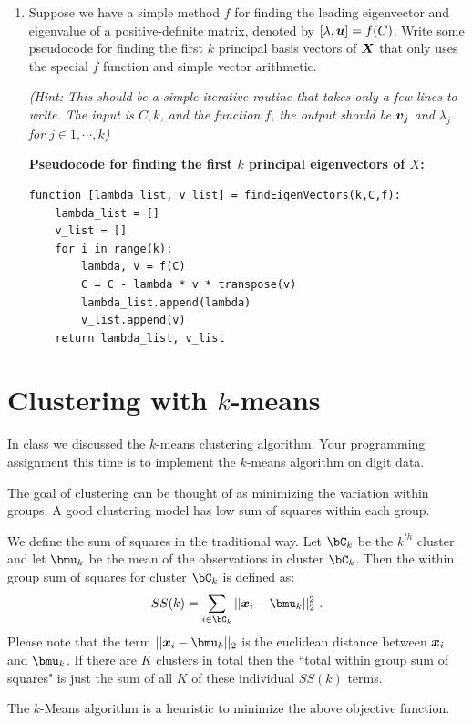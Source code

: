 \documentclass{article}
\begin{document}
\begin{enumerate}[label=(\alph*)]
\item Suppose we have a simple method $f$ for finding the leading eigenvector and eigenvalue of a positive-definite matrix, denoted by
$[\lambda, \boldsymbol{u}] = f(C)$. Write some pseudocode for finding the first $k$ principal basis vectors of $\boldsymbol{X}$ that only uses the special $f$ function
and simple vector arithmetic.

\emph{(Hint: This should be a simple iterative routine that takes only a few lines to write. The input is $C, k$, and the function $f$, the output
should be $\boldsymbol{v}_j$ and $\lambda_j$ for $j \in 1,\cdots, k$)}

\begin{mdframed}[backgroundcolor=lightgray]
\textbf{Pseudocode for finding the first $k$ principal eigenvectors of $X$:}\\
\begin{lstlisting}
function [lambda_list, v_list] = findEigenVectors(k,C,f):
	lambda_list = []
	v_list = []
	for i in range(k):
		lambda, v = f(C)
		C = C - lambda * v * transpose(v)
		lambda_list.append(lambda)
		v_list.append(v)
	return lambda_list, v_list
\end{lstlisting}
\end{mdframed}

\end{enumerate}


\section{Clustering with $k$-means}

In class we discussed the $k$-means clustering algorithm. Your programming assignment this time is to implement the $k$-means algorithm on digit data. 

The goal of clustering can be thought of as minimizing the variation within groups. A good clustering model has low sum of squares within each group. 

We define the sum of squares in the traditional way. Let $\bC_k$ be the $k^{th}$ cluster and let $\bmu_k$ be the mean of the observations in cluster
$\bC_k$. Then the within group sum of squares for cluster $\bC_k$ is defined as:
\[
SS(k) = \sum_{i\in \bC_k} ||\bx_i - \bmu_k||^2_2~.
\]
Please note that the term $||\bx_i - \bmu_k||_2$ is the euclidean distance between
$\boldsymbol{x}_i$ and $\bmu_k$.
If there are $K$ clusters in total then the ``total within group sum of squares" is just the sum of all $K$ of these individual $SS(k)$ terms.

The $k$-Means algorithm is a heuristic to minimize the above objective function.
\end{document}
